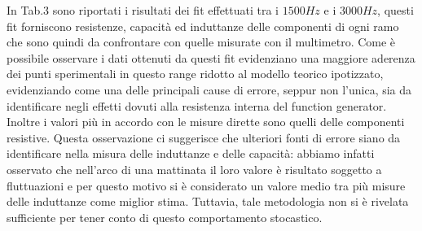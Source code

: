 \documentclass[]{article}
\begin{document}
In Tab.3 sono riportati i risultati dei fit effettuati tra i $1500Hz$ e i $3000Hz$, questi fit forniscono resistenze, capacità ed induttanze delle componenti di ogni ramo che sono quindi da confrontare con quelle misurate con il multimetro.  
Come è possibile osservare i dati ottenuti da questi fit evidenziano una maggiore aderenza dei punti sperimentali in questo range ridotto al modello teorico ipotizzato, evidenziando come una delle principali cause di errore, seppur non l'unica, sia da identificare negli effetti dovuti alla resistenza interna del function generator. \\

Inoltre i valori più in accordo con le misure dirette sono quelli delle componenti resistive. Questa osservazione ci suggerisce che ulteriori fonti di errore siano da identificare nella misura delle induttanze e delle capacità: abbiamo infatti osservato che nell'arco di una mattinata il loro valore è risultato soggetto a fluttuazioni e per questo motivo si è considerato un valore medio tra più misure delle induttanze come miglior stima. Tuttavia, tale metodologia non si è rivelata sufficiente per tener conto di questo comportamento stocastico.  
\end{document}
